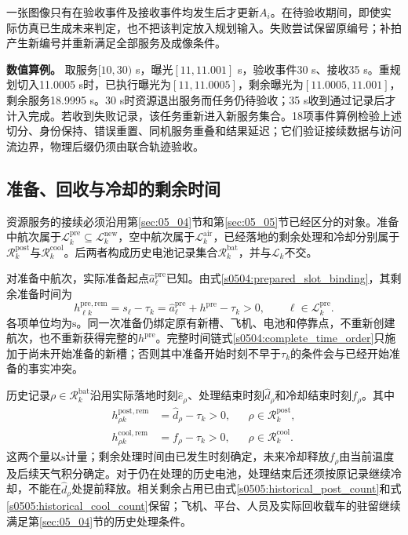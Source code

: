 一张图像只有在验收事件及接收事件均发生后才更新$A_i$。在待验收期间，即使实际仿真已生成未来判定，也不把该判定放入规划输入。失败尝试保留原编号；补拍产生新编号并重新满足全部服务及成像条件。

\textbf{数值算例。} 取服务$[10,30)$ s，曝光$[11,11.001]$ s，验收事件30 s、接收35 s。重规划切入11.0005 s时，已执行曝光为$[11,11.0005]$，剩余曝光为$[11.0005,11.001]$，剩余服务18.9995 s。30 s时资源退出服务而任务仍待验收；35 s收到通过记录后才计入完成。若收到失败记录，该任务重新进入新服务集合。18项事件算例检验上述切分、身份保持、错误重置、同机服务重叠和结果延迟；它们验证接续数据与访问流边界，物理后缀仍须由联合轨迹验收。

\subsection{准备、回收与冷却的剩余时间}

资源服务的接续必须沿用第\ref{sec:05_04}节和第\ref{sec:05_05}节已经区分的对象。准备中航次属于$\mathcal L_k^{\mathrm{pre}}\subseteq\mathcal L_k^{\mathrm{new}}$，空中航次属于$\mathcal L_k^{\mathrm{air}}$，已经落地的剩余处理和冷却分别属于$\mathcal R_k^{\mathrm{post}}$与$\mathcal R_k^{\mathrm{cool}}$。后两者构成历史电池记录集合$\mathcal R_k^{\mathrm{bat}}$，并与$\mathcal L_k$不交。

对准备中航次，实际准备起点$\widehat a_\ell^{\mathrm{pre}}$已知。由式\eqref{s0504:prepared_slot_binding}，其剩余准备时间为
\begin{equation}
 h_{\ell k}^{\mathrm{pre,rem}}
 =s_\ell-\tau_k
 =\widehat a_\ell^{\mathrm{pre}}+h^{\mathrm{pre}}-\tau_k>0,
 \qquad\ell\in\mathcal L_k^{\mathrm{pre}}.
 \label{s0507:remaining_preparation}
\end{equation}
各项单位均为$\mathrm s$。同一次准备仍绑定原有新槽、飞机、电池和停靠点，不重新创建航次，也不重新获得完整的$h^{\mathrm{pre}}$。完整时间链式\eqref{s0504:complete_time_order}只施加于尚未开始准备的新槽；否则其中准备开始时刻不早于$\tau_k$的条件会与已经开始准备的事实冲突。

历史记录$\rho\in\mathcal R_k^{\mathrm{bat}}$沿用实际落地时刻$\widehat e_\rho$、处理结束时刻$\widehat d_\rho$和冷却结束时刻$f_\rho$。其中
\begin{align}
 h_{\rho k}^{\mathrm{post,rem}}
 &=\widehat d_\rho-\tau_k>0,
 &&\rho\in\mathcal R_k^{\mathrm{post}},
 \label{s0507:remaining_processing}\\
 h_{\rho k}^{\mathrm{cool,rem}}
 &=f_\rho-\tau_k>0,
 &&\rho\in\mathcal R_k^{\mathrm{cool}}.
 \label{s0507:remaining_cooling}
\end{align}
这两个量以$\mathrm s$计量；剩余处理时间由已发生时刻确定，未来冷却释放$f_\rho$由当前温度及后续天气积分确定。对于仍在处理的历史电池，处理结束后还须按原记录继续冷却，不能在$\widehat d_\rho$处提前释放。相关剩余占用已由式\eqref{s0505:historical_post_count}和式\eqref{s0505:historical_cool_count}保留；飞机、平台、人员及实际回收载车的驻留继续满足第\ref{sec:05_04}节的历史处理条件。

